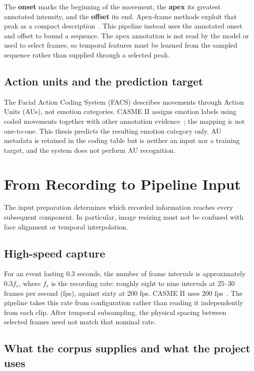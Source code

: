 The \textbf{onset} marks the beginning of the movement, the \textbf{apex} its greatest annotated intensity, and the \textbf{offset} its end. Apex-frame methods exploit that peak as a compact description~\cite{liY2018}. This pipeline instead uses the annotated onset and offset to bound a sequence. The apex annotation is not read by the model or used to select frames, so temporal features must be learned from the sampled sequence rather than supplied through a selected peak.

\subsection{Action units and the prediction target}
\label{sec:action-units}

The Facial Action Coding System (FACS) describes movements through Action Units (AUs), not emotion categories. CASME II assigns emotion labels using coded movements together with other annotation evidence~\cite{yan2014}; the mapping is not one-to-one. This thesis predicts the resulting emotion category only. AU metadata is retained in the coding table but is neither an input nor a training target, and the system does not perform AU recognition.

\section{From Recording to Pipeline Input}
\label{sec:recording-to-input}

The input preparation determines which recorded information reaches every subsequent component. In particular, image resizing must not be confused with face alignment or temporal interpolation.

\subsection{High-speed capture}
\label{sec:high-speed-capture}

For an event lasting $0.3$ seconds, the number of frame intervals is approximately $0.3f_s$, where $f_s$ is the recording rate: roughly eight to nine intervals at 25--30 frames per second (fps), against sixty at 200 fps. CASME II uses 200 fps~\cite{yan2014}. The pipeline takes this rate from configuration rather than reading it independently from each clip. After temporal subsampling, the physical spacing between selected frames need not match that nominal rate.

\subsection{What the corpus supplies and what the project uses}
\label{sec:corpus-supplies}

